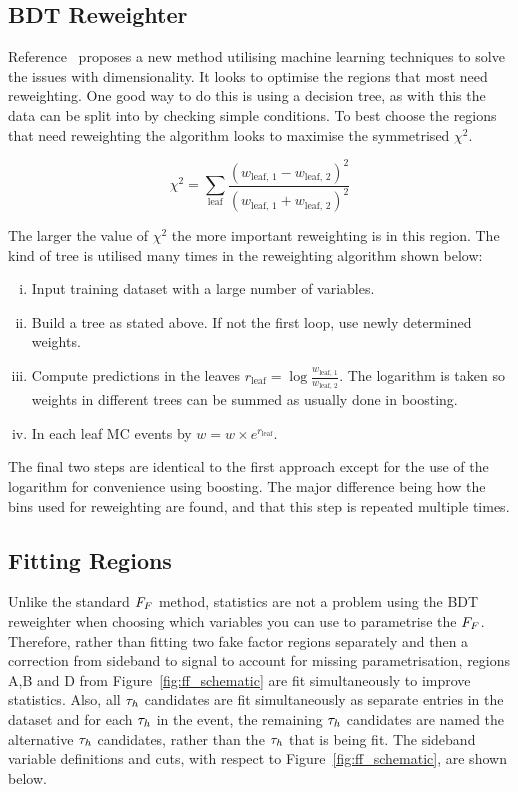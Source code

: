 \subsection{BDT Reweighter}

Reference~\cite{Rogozhnikov:2016bdp} proposes a new method utilising machine learning techniques to solve the issues with dimensionality. 
It looks to optimise the regions that most need reweighting. 
One good way to do this is using a decision tree, as with this the data can be split into  by checking simple conditions.
To best choose the regions that need reweighting the algorithm looks to maximise the symmetrised $\chi^2$.

\begin{equation}
\chi^2 = \sum_{\text{leaf}} \frac{(w_{\text{leaf, 1}}-w_{\text{leaf, 2}})^2}{(w_{\text{leaf, 1}}+w_{\text{leaf, 2}})^2}
\end{equation}

The larger the value of $\chi^2$ the more important reweighting is in this region. 
The kind of tree is utilised many times in the reweighting algorithm shown below:

\begin{enumerate}[i)]
\item Input training dataset with a large number of variables.
\item Build a tree as stated above. If not the first loop, use newly determined weights.
\item Compute predictions in the leaves $r_{\text{leaf}} = \log\frac{w_{\text{leaf, 1}}}{w_{\text{leaf, 2}}}$. The logarithm is taken so weights in different trees can be summed as usually done in boosting.
\item In each leaf MC events by $w = w \times e^{r_{\text{leaf}}}$.
\end{enumerate}

The final two steps are identical to the first approach except for the use of the logarithm for convenience using boosting. 
The major difference being how the bins used for reweighting are found, and that this step is repeated multiple times. \\

\subsection{Fitting Regions}

Unlike the standard $F_{F}$ method, statistics are not a problem using the \ac{BDT} reweighter when choosing which variables you can use to parametrise the $F_{F}$. 
Therefore, rather than fitting two fake factor regions separately and then a correction from sideband to signal to account for missing parametrisation, regions A,B and D from Figure~\ref{fig:ff_schematic} are fit simultaneously to improve statistics. 
Also, all $\tau_{h}$ candidates are fit simultaneously as separate entries in the dataset and for each $\tau_{h}$ in the event, the remaining $\tau_{h}$ candidates are named the alternative $\tau_{h}$ candidates, rather than the $\tau_{h}$ that is being fit. 
The sideband variable definitions and cuts, with respect to Figure~\ref{fig:ff_schematic}, are shown below. \\

